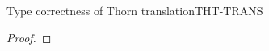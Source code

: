 \documentclass[acmlarge, anonymous, authordraft, review]{acmart} %
\begin{document}
\begin{lemma}{Type correctness of Thorn translation}{THT-TRANS}
\begin{proof}
% 
% 
% 
% 

\end{proof}
\end{lemma}
\end{document}
